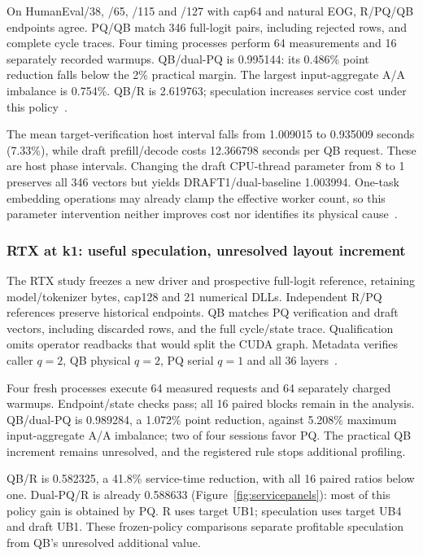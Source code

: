 On HumanEval/38, /65, /115 and /127 with cap64 and natural EOG, R/PQ/QB endpoints agree. PQ/QB match 346 full-logit pairs, including rejected rows, and complete cycle traces. Four timing processes perform 64 measurements and 16 separately recorded warmups. QB/dual-PQ is 0.995144: its 0.486\% point reduction falls below the 2\% practical margin. The largest input-aggregate A/A imbalance is 0.754\%. QB/R is 2.619763; speculation increases service cost under this policy~\cite{b570servicerecords}.

The mean target-verification host interval falls from 1.009015 to 0.935009 seconds (7.33\%), while draft prefill/decode costs 12.366798 seconds per QB request. These are host phase intervals. Changing the draft CPU-thread parameter from 8 to 1 preserves all 346 vectors but yields DRAFT1/dual-baseline 1.003994. One-task embedding operations may already clamp the effective worker count, so this parameter intervention neither improves cost nor identifies its physical cause~\cite{b570policyrecords}.

\subsubsection{RTX at k1: useful speculation, unresolved layout increment}
The RTX study freezes a new driver and prospective full-logit reference, retaining model/tokenizer bytes, cap128 and 21 numerical DLLs. Independent R/PQ references preserve historical endpoints. QB matches PQ verification and draft vectors, including discarded rows, and the full cycle/state trace. Qualification omits operator readbacks that would split the CUDA graph. Metadata verifies caller $q=2$, QB physical $q=2$, PQ serial $q=1$ and all 36 layers~\cite{rtxservicerecords}.

Four fresh processes execute 64 measured requests and 64 separately charged warmups. Endpoint/state checks pass; all 16 paired blocks remain in the analysis. QB/dual-PQ is 0.989284, a 1.072\% point reduction, against 5.208\% maximum input-aggregate A/A imbalance; two of four sessions favor PQ. The practical QB increment remains unresolved, and the registered rule stops additional profiling.

QB/R is 0.582325, a 41.8\% service-time reduction, with all 16 paired ratios below one. Dual-PQ/R is already 0.588633 (Figure~\ref{fig:servicepanels}): most of this policy gain is obtained by PQ. R uses target UB1; speculation uses target UB4 and draft UB1. These frozen-policy comparisons separate profitable speculation from QB's unresolved additional value.


